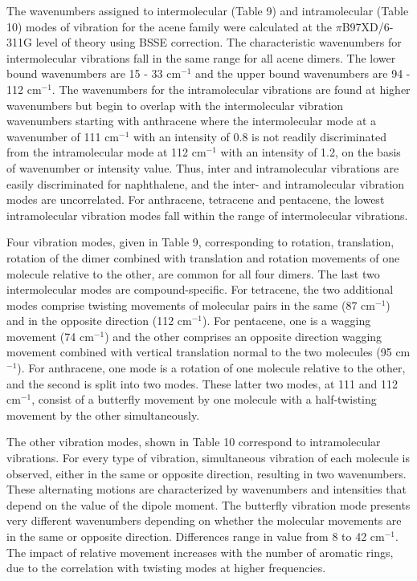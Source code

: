 The wavenumbers assigned to intermolecular (Table 9) and intramolecular (Table 10) modes of vibration for the acene family were calculated at the $\pi$B97XD/6-311G level of theory using BSSE correction. The characteristic wavenumbers for intermolecular vibrations fall in the same range for all  acene dimers. The lower bound wavenumbers are 15 - 33 cm$^{-1}$ and the upper bound wavenumbers are 94 - 112 cm$^{-1}$. The wavenumbers for the intramolecular vibrations are found at higher wavenumbers but begin to overlap with the intermolecular vibration wavenumbers starting with anthracene where the intermolecular mode at a wavenumber of 111 cm$^{-1}$ with an intensity of 0.8 is not readily discriminated from the intramolecular mode at 112 cm$^{-1}$ with an intensity of 1.2, on the basis of wavenumber or intensity value. Thus, inter and intramolecular vibrations are easily discriminated for naphthalene, and the inter- and intramolecular vibration modes are uncorrelated. For anthracene, tetracene and pentacene, the lowest intramolecular vibration modes fall within the range of intermolecular vibrations. 

Four vibration modes, given in Table 9, corresponding to rotation, translation, rotation of the dimer combined with translation and rotation movements of one molecule relative to the other, are common for all four dimers. The last two intermolecular modes are compound-specific. For tetracene, the two additional modes comprise twisting movements of molecular pairs in the same (87 cm$^{-1}$) and in the opposite direction (112 cm$^{-1}$). For pentacene, one is a wagging movement (74 cm$^{-1}$) and the other comprises an opposite direction wagging movement combined with vertical translation normal to the two molecules (95 cm$^{-1}$). For anthracene, one mode is a rotation of one molecule relative to the other, and the second is split into two modes. These latter two modes, at 111 and 112 cm$^{-1}$, consist of a butterfly movement by one molecule with a half-twisting movement by the other simultaneously.

The other vibration modes, shown in Table 10 correspond to intramolecular vibrations. For every type of vibration, simultaneous vibration of each molecule is observed, either in the same or opposite direction, resulting in two wavenumbers. These alternating motions are characterized by wavenumbers and intensities that depend on the value of the dipole moment. The butterfly vibration mode presents very different wavenumbers depending on whether the molecular movements are in the same or opposite direction. Differences range in value from 8 to 42 cm$^{-1}$. The impact of relative movement increases with the number of aromatic rings, due to the correlation with twisting modes at higher frequencies. 

